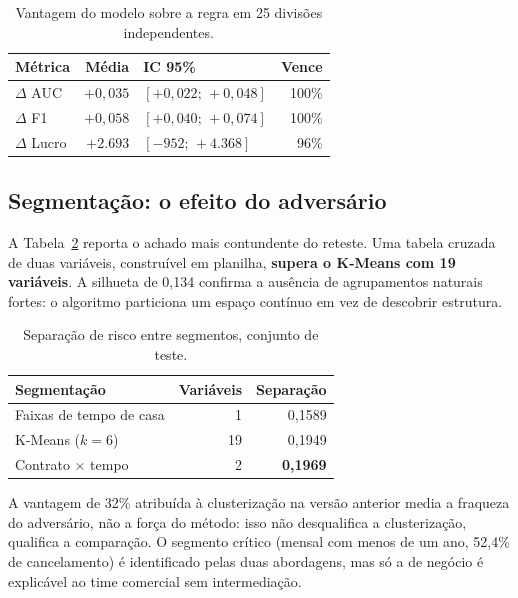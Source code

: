 \documentclass[10pt,a4paper]{article}
\begin{document}
\begin{table}[t]
\centering
\small
\caption{Vantagem do modelo sobre a regra em 25 divisões independentes.}
\label{tab:estabilidade}
\begin{tabular}{@{}lrlr@{}}
\toprule
\textbf{Métrica} & \textbf{Média} & \textbf{IC 95\%} & \textbf{Vence} \\
\midrule
\(\Delta\) AUC   & $+0{,}035$ & $[+0{,}022;\,+0{,}048]$ & 100\% \\
\(\Delta\) F1    & $+0{,}058$ & $[+0{,}040;\,+0{,}074]$ & 100\% \\
\(\Delta\) Lucro & $+2.693$   & $[-952;\,+4.368]$       & 96\%  \\
\bottomrule
\end{tabular}
\end{table}

\subsection{Segmentação: o efeito do adversário}

A Tabela~\ref{tab:segmentacao} reporta o achado mais contundente do reteste. Uma tabela
cruzada de duas variáveis, construível em planilha, \textbf{supera o K-Means com 19
variáveis}. A silhueta de 0,134 confirma a ausência de agrupamentos naturais fortes: o
algoritmo particiona um espaço contínuo em vez de descobrir estrutura.

\begin{table}[t]
\centering
\small
\caption{Separação de risco entre segmentos, conjunto de teste.}
\label{tab:segmentacao}
\begin{tabular}{@{}lrr@{}}
\toprule
\textbf{Segmentação} & \textbf{Variáveis} & \textbf{Separação} \\
\midrule
Faixas de tempo de casa      & 1  & 0,1589 \\
K-Means (\(k=6\))            & 19 & 0,1949 \\
Contrato \(\times\) tempo    & 2  & \textbf{0,1969} \\
\bottomrule
\end{tabular}
\end{table}

A vantagem de 32\% atribuída à clusterização na versão anterior media a fraqueza do adversário,
não a força do método: isso não desqualifica a clusterização, qualifica a comparação. O segmento
crítico (mensal com menos de um ano, 52,4\% de cancelamento) é identificado pelas duas
abordagens, mas só a de negócio é explicável ao time comercial sem intermediação.
\end{document}
